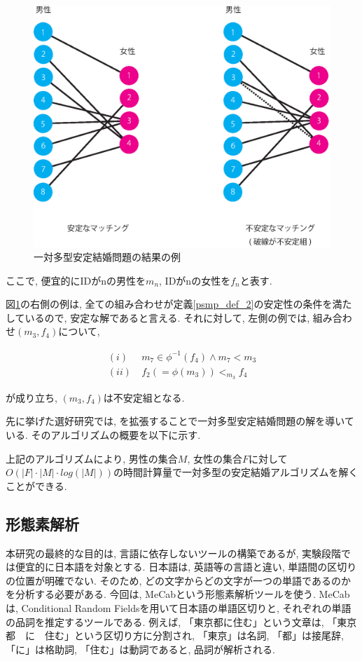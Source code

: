 \documentclass[12pt]{jarticle}
\begin{document}
\begin{figure}
  \begin{center}
    \includegraphics[scale = 0.5]{image/psmp.eps}
  \end{center}
  \caption{一対多型安定結婚問題の結果の例}
  \label{result_of_psmp}
\end{figure}

ここで, 便宜的にIDがnの男性を$m_n$, IDがnの女性を$f_n$と表す. 

図\ref{result_of_psmp}の右側の例は, 全ての組み合わせが定義\ref{psmp_def_2}の安定性の条件を満たしているので, 安定な解であると言える. 
それに対して, 左側の例では, 組み合わせ$(m_3, f_4)$について, 

\begin{align}
(i)  & \ m_7 \in \phi^{-1} (f_4) \land m_7 < m_3   \\
(ii) & \ f_2(= \phi(m_3)) < _{m_3} f_4
\end{align}

が成り立ち, $(m_3, f_4)$は不安定組となる. 

先に挙げた選好研究\cite{psmp}では, \gsa を拡張することで一対多型安定結婚問題の解を導いている. 
そのアルゴリズムの概要を以下に示す. 



上記のアルゴリズムにより, 男性の集合$M$, 女性の集合$F$に対して$O(|F| \cdot |M| \cdot log(|M|))$の時間計算量で一対多型の安定結婚アルゴリズムを解くことができる. 

\subsection{形態素解析}
本研究の最終的な目的は, 言語に依存しないツールの構築であるが, 実験段階では便宜的に日本語を対象とする. 日本語は, 英語等の言語と違い, 単語間の区切りの位置が明確でない. そのため, どの文字からどの文字が一つの単語であるのかを分析する必要がある. 今回は, MeCab\cite{MeCab}という形態素解析ツールを使う. MeCabは, Conditional Random Fieldsを用いて日本語の単語区切りと, それぞれの単語の品詞を推定するツールである. 例えば, 「東京都に住む」という文章は, 「東京　都　に　住む」という区切り方に分割され, 「東京」は名詞, 「都」は接尾辞, 「に」は格助詞, 「住む」は動詞であると, 品詞が解析される. 
\end{document}

